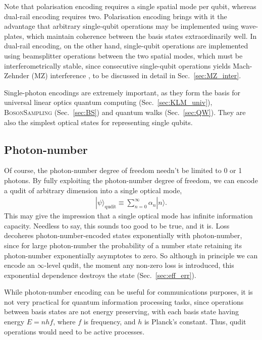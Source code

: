 \documentclass[aps, rmp, twocolumn, amsmath, amssymb, nofootinbib, superscriptaddress, longbibliography, floatfix, table-of-contents, eqsecnum]{revtex4-1}
\newcommand{\ket}[1]{|#1\rangle}
\begin{document}
Note that polarisation encoding requires a single spatial mode per qubit, whereas dual-rail encoding requires two. Polarisation encoding brings with it the advantage that arbitrary single-qubit operations may be implemented using wave-plates, which maintain coherence between the basis states extraordinarily well. In dual-rail encoding, on the other hand, single-qubit operations are implemented using beamsplitter operations between the two spatial modes, which must be interferometrically stable, since consecutive single-qubit operations yields Mach-Zehnder (MZ) interference \cite{bib:Zehnder1, bib:Zehnder2}, to be discussed in detail in Sec.~\ref{sec:MZ_inter}.

Single-photon encodings are extremely important, as they form the basis for universal linear optics quantum computing (Sec.~\ref{sec:KLM_univ}), \textsc{BosonSampling} (Sec.~\ref{sec:BS}) and quantum walks (Sec.~\ref{sec:QW}). They are also the simplest optical states for representing single qubits.

%
%

\subsection{Photon-number} 

Of course, the photon-number degree of freedom needn't be limited to 0 or 1 photons. By fully exploiting the photon-number degree of freedom, we can encode a qudit of arbitrary dimension into a single optical mode,
\begin{align} \label{eq:number_qudit}
\ket\psi_\text{qudit} \equiv \sum_{n=0}^\infty \alpha_n \ket{n}.
\end{align}
This may give the impression that a single optical mode has infinite information capacity. Needless to say, this sounds too good to be true, and it is. Loss decoheres photon-number-encoded states exponentially with photon-number, since for large photon-number the probability of a number state retaining its photon-number exponentially asymptotes to zero. So although in principle we can encode an $\infty$-level qudit, the moment any non-zero loss is introduced, this exponential dependence destroys the state (Sec.~\ref{sec:eff_err}).

While photon-number encoding can be useful for communications purposes, it is not very practical for quantum information processing tasks, since operations between basis states are not energy preserving, with each basis state having energy \mbox{$E=nhf$}, where $f$ is frequency, and $h$ is Planck's constant. Thus, qudit operations would need to be active processes.
\end{document}
